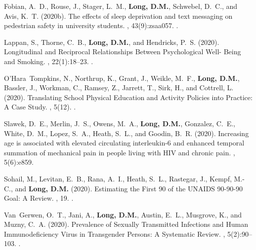 \begin{thebibliography}{}
Fobian, A.~D., Rouse, J., Stager, L.~M., \textbf{Long, D.M.}, Schwebel, D.~C., and Avis,
  K.~T. (2020b).
\newblock The effects of sleep deprivation and text messaging on pedestrian
  safety in university students.
, 43(9):zsaa057.
.  


Lappan, S., Thorne, C.~B., \textbf{Long, D.M.}, and Hendricks, P.~S. (2020).
\newblock Longitudinal and {Reciprocal} {Relationships} {Between}
  {Psychological} {Well}- {Being} and {Smoking}.
, 22(1):18--23.
.  


O'Hara~Tompkins, N., Northrup, K., Grant, J., Weikle, M.~F., \textbf{Long, D.M.}, Bassler,
  J., Workman, C., Ramsey, Z., Jarrett, T., Sirk, H., and Cottrell, L. (2020).
\newblock Translating {School} {Physical} {Education} and {Activity} {Policies}
  into {Practice}: {A} {Case} {Study}.
, 5(12).
.  


Slawek, D.~E., Merlin, J.~S., Owens, M.~A., \textbf{Long, D.M.}, Gonzalez, C.~E.,
  White, D.~M., Lopez, S.~A., Heath, S.~L., and Goodin, B.~R. (2020).
\newblock Increasing age is associated with elevated circulating interleukin-6
  and enhanced temporal summation of mechanical pain in people living with
  {HIV} and chronic pain.
, 5(6):e859.

Sohail, M., Levitan, E.~B., Rana, A.~I., Heath, S.~L., Rastegar, J., Kempf,
  M.-C., and \textbf{Long, D.M.} (2020).
\newblock Estimating the {First} 90 of the {UNAIDS} 90-90-90 {Goal}: {A}
  {Review}.
, 19.
.  


Van~Gerwen, O.~T., Jani, A., \textbf{Long, D.M.}, Austin, E.~L., Musgrove, K., and
  Muzny, C.~A. (2020).
\newblock Prevalence of {Sexually} {Transmitted} {Infections} and {Human}
  {Immunodeficiency} {Virus} in {Transgender} {Persons}: {A} {Systematic}
  {Review}.
, 5(2):90--103.
.  



\end{thebibliography}
